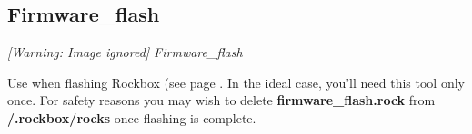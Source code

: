 \subsection{Firmware\_flash}
{\centering\mdseries\itshape
  [Warning: Image ignored] %
 \newline
Firmware\_flash
\par}

Use when flashing Rockbox (see page \pageref{ref:FlashingRockboxReal}.
In the ideal case, you'll need this tool only once. For safety reasons you may wish to delete \textbf{firmware\_flash.rock} from \textbf{/.rockbox/rocks} once flashing is complete.


